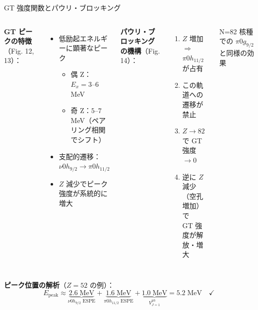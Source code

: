 \documentclass[aspectratio=169,12pt]{beamer}
\begin{document}
\begin{frame}{GT 強度関数とパウリ・ブロッキング}
  \begin{columns}
    \textbf{GT ピークの特徴}（Fig. 12, 13）：
    \begin{itemize}
      \item 低励起エネルギーに顕著なピーク
        \begin{itemize}
          \item 偶 Z：$E_x = 3$--$6$ MeV
          \item 奇 Z：$5$--$7$ MeV（ペアリング相関でシフト）
        \end{itemize}
      \item 支配的遷移：$\nu 0h_{9/2} \to \pi 0h_{11/2}$
      \item $Z$ 減少でピーク強度が系統的に増大
    \end{itemize}

    \textbf{パウリ・ブロッキングの機構}（Fig. 14）：
    \begin{enumerate}
      \item $Z$ 増加 $\Rightarrow$ $\pi 0h_{11/2}$ が占有
      \item この軌道への遷移が禁止
      \item $Z \to 82$ で GT 強度 $\to 0$
      \item 逆に $Z$ 減少（空孔増加）で\\GT 強度が解放・増大
    \end{enumerate}
    \vspace{0.3em}
    \alert{N=82 核種での $\pi 0g_{9/2}$ と同様の効果}
  \end{columns}

  \vspace{0.3em}
  \textbf{ピーク位置の解析}（$Z=52$ の例）：
  \begin{equation*}
    E_\text{peak} \approx \underbrace{2.6\;\text{MeV}}_{\nu 0h_{9/2}\text{ ESPE}}
    + \underbrace{1.6\;\text{MeV}}_{\pi 0h_{11/2}\text{ ESPE}}
    + \underbrace{1.0\;\text{MeV}}_{V_{J=1}^{ph}}
    = 5.2\;\text{MeV} \quad \checkmark
  \end{equation*}
\end{frame}
\end{document}

